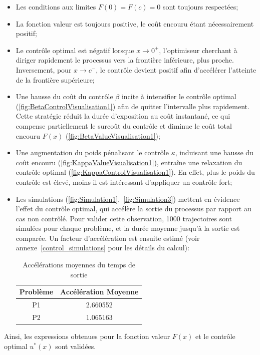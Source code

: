 \begin{itemize}
    \item Les conditions aux limites $F(0)=F(c)=0$ sont toujours respectées;
    \item La fonction valeur est toujours positive, le coût encouru étant nécessairement positif;
    \item Le contrôle optimal est négatif lorsque \( x \to 0^+ \), l'optimiseur cherchant à diriger rapidement le processus vers la frontière inférieure, plus proche. Inversement, pour \( x \to c^-\), le contrôle devient positif afin d'accélérer l'atteinte de la frontière supérieure;
    \item Une hausse du coût du contrôle $\beta$ incite à intensifier le contrôle optimal (\ref{fig:BetaControlVisualisation1}) afin de quitter l'intervalle plus rapidement. Cette stratégie réduit la durée d'exposition au coût instantané, ce qui compense partiellement le surcoût du contrôle et diminue le coût total encouru $F(x)$ (\ref{fig:BetaValueVisualisation1});
    \item Une augmentation du poids pénalisant le contrôle $\kappa$, induisant une hausse du coût encouru (\ref{fig:KappaValueVisualisation1}), entraîne une relaxation du contrôle optimal (\ref{fig:KappaControlVisualisation1}). En effet, plus le poids du contrôle est élevé, moins il est intéressant d'appliquer un contrôle fort;
    \item Les simulations (\ref{fig:Simulation1},~\ref{fig:Simulation3}) mettent en évidence l'effet du contrôle optimal, qui accélère la sortie du processus par rapport au cas non contrôlé. Pour valider cette observation, 1000 trajectoires sont simulées pour chaque problème, et la durée moyenne jusqu'à la sortie est comparée. Un facteur d'accélération est ensuite estimé (voir annexe~\ref{control_simulations} pour les détails du calcul):
    \begin{table}[htb]
        \centering
        \caption{Accélérations moyennes du temps de sortie}\label{tab:acceleration_results}
        \renewcommand{\arraystretch}{1.1}
        \begin{tabular}{||c|c||}
        \hline
        Problème & Accélération Moyenne \\\hline\hline
        P1 & 2.660552 \\
        P2 & 1.065163 \\\hline
        \end{tabular}
    \end{table}
\end{itemize}\FloatBarrier Ainsi, les expressions obtenues pour la fonction valeur $F(x)$ et le contrôle optimal $u^*(x)$ sont validées.

